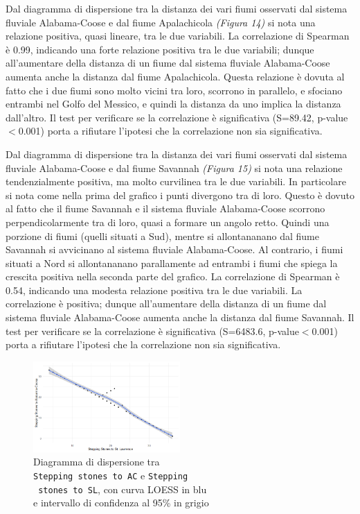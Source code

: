 \documentclass{article} %
\begin{document}
Dal diagramma di dispersione tra la distanza dei vari fiumi osservati dal sistema fluviale Alabama-Coose e dal fiume Apalachicola \textit{(Figura 14)} si nota una relazione positiva, quasi lineare, tra le due variabili.  
La correlazione di Spearman è 0.99, indicando una forte relazione positiva tra le due variabili; dunque all'aumentare della distanza di un fiume dal sistema fluviale Alabama-Coose aumenta anche la distanza dal fiume Apalachicola. 
Questa relazione è dovuta al fatto che i due fiumi sono molto vicini tra loro, scorrono in parallelo, e sfociano entrambi nel Golfo del Messico, e quindi la distanza da uno implica la distanza dall'altro.
Il test per verificare se la correlazione è significativa (S=89.42, p-value$<$0.001) porta a rifiutare l'ipotesi che la correlazione non sia significativa.

Dal diagramma di dispersione tra la distanza dei vari fiumi osservati dal sistema fluviale Alabama-Coose e dal fiume Savannah \textit{(Figura 15)} si nota una relazione tendenzialmente positiva, ma molto curvilinea tra le due variabili. 
In particolare si nota come nella prima del grafico i punti divergono tra di loro. Questo è dovuto al fatto che il fiume Savannah e il sistema fluviale Alabama-Coose scorrono perpendicolarmente tra di loro, quasi a formare un angolo retto. Quindi una porzione di fiumi (quelli situati a Sud), mentre si allontananano dal fiume Savannah si avvicinano al sistema fluviale Alabama-Coose. Al contrario, i fiumi situati a Nord si allontananano parallamente ad entrambi i fiumi che spiega la crescita positiva nella seconda parte del grafico.
La correlazione di Spearman è 0.54, indicando una modesta relazione positiva tra le due variabili. La correlazione è positiva; dunque all'aumentare della distanza di un fiume dal sistema fluviale Alabama-Coose aumenta anche la distanza dal fiume Savannah. 
Il test per verificare se la correlazione è significativa (S=6483.6, p-value$<$0.001) porta a rifiutare l'ipotesi che la correlazione non sia significativa.

\begin{figure}[H]
    \centering
    \includegraphics[width=0.5\textwidth]{immagini/ac_sl.png}
    \captionsetup{justification=centering}
    \caption{Diagramma di dispersione tra \\\texttt{Stepping stones to AC} e \texttt{Stepping}\\\texttt{ stones to SL}, con curva LOESS in blu \\e intervallo di confidenza al 95\% in grigio}
\end{figure}
\end{document}
